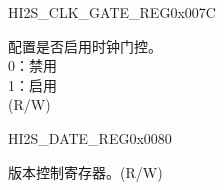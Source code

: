 \begin{register}{H}{I2S\_CLK\_GATE\_REG}{0x007C}\label{regdesc:I2SCLKGATEREG}
%
%
\regnewline%
\begin{regdesc}\begin{reglist}
\label{fielddesc:I2SCLKEN}\item [I2S\_CLK\_EN] 配置是否启用时钟门控。 \\
0：禁用\\
1：启用\\
(R/W)
\end{reglist}\end{regdesc}
\end{register}


\begin{register}{H}{I2S\_DATE\_REG}{0x0080}\label{regdesc:I2SDATEREG}
%
%
\regnewline%
\begin{regdesc}\begin{reglist}
\label{fielddesc:I2SDATE}\item [I2S\_DATE] 版本控制寄存器。(R/W)
\end{reglist}\end{regdesc}
\end{register}
